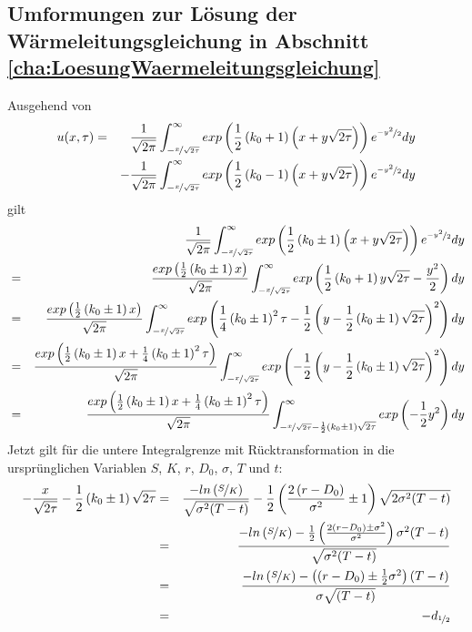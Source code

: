 \subsection{Umformungen zur Lösung der Wärmeleitungsgleichung in Abschnitt \ref{cha:LoesungWaermeleitungsgleichung}} \label{Anhang:UmformungenWLG}
Ausgehend von
\begin{eqnarray*}
u(x,\tau) & = & \frac{1}{\sqrt{2\pi}}\int _{-\nicefrac{x}{\sqrt{2\tau}}}^{\infty} exp\left(\frac{1}{2}\left(k_0+1\right)\left(x+y\sqrt{2\tau}\right)\right)e^{\nicefrac{-y^2}{2}}dy \\
 &   & - \frac{1}{\sqrt{2\pi}}\int _{-\nicefrac{x}{\sqrt{2\tau}}}^{\infty} exp\left(\frac{1}{2}\left(k_0-1\right)\left(x+y\sqrt{2\tau}\right)\right)e^{\nicefrac{-y^2}{2}}dy 
\end{eqnarray*}
gilt
\begin{eqnarray*}
& & \frac{1}{\sqrt{2\pi}}\int _{-\nicefrac{x}{\sqrt{2\tau}}}^{\infty} exp\left(\frac{1}{2}\left(k_0\pm 1\right)\left(x+y\sqrt{2\tau}\right)\right)e^{\nicefrac{-y^2}{2}}dy \\
& = & \frac{exp\left(\frac{1}{2}\left(k_0\pm 1\right)x\right)}{\sqrt{2\pi}} \int _{-\nicefrac{x}{\sqrt{2\tau}}}^{\infty} exp\left(\frac{1}{2}\left(k_0+1\right)y\sqrt{2\tau}-\frac{y^2}{2}\right)dy \\
& = & \frac{exp\left(\frac{1}{2}\left(k_0\pm 1\right)x\right)}{\sqrt{2\pi}} \int _{-\nicefrac{x}{\sqrt{2\tau}}}^{\infty} exp\left(\frac{1}{4}\left(k_0 \pm 1\right)^2\tau -\frac{1}{2}\left(y-\frac{1}{2}\left(k_0\pm 1\right)\sqrt{2\tau}\right)^2\right)dy \\
& = & \frac{exp\left(\frac{1}{2}\left(k_0\pm 1\right)x + \frac{1}{4}\left(k_0 \pm 1\right)^2\tau\right)}{\sqrt{2\pi}} \int _{-\nicefrac{x}{\sqrt{2\tau}}}^{\infty} exp\left(-\frac{1}{2}\left(y-\frac{1}{2}\left(k_0\pm 1\right)\sqrt{2\tau}\right)^2\right)dy \\
& = & \frac{exp\left(\frac{1}{2}\left(k_0\pm 1\right)x + \frac{1}{4}\left(k_0 \pm 1\right)^2\tau\right)}{\sqrt{2\pi}} \int _{-\nicefrac{x}{\sqrt{2\tau}}-\frac{1}{2}\left(k_0\pm 1\right)\sqrt{2\tau}}^{\infty} exp\left(-\frac{1}{2}y^2\right)dy 
\end{eqnarray*}
Jetzt gilt für die untere Integralgrenze mit Rücktransformation in die ursprünglichen Variablen $S$, $K$, $r$, $D_0$, $\sigma$, $T$ und $t$:
\begin{eqnarray*}
-\frac{x}{\sqrt{2\tau}}-\frac{1}{2}\left(k_0\pm 1\right)\sqrt{2\tau} & = & \frac{-ln\left(\nicefrac{S}{K}\right)}{\sqrt{\sigma^2(T-t)}} - \frac{1}{2}\left(\frac{2\left(r-D_0\right)}{\sigma^2} \pm 1\right)\sqrt{2\sigma^2(T-t)} \\
& = & \frac{-ln\left(\nicefrac{S}{K}\right) -\frac{1}{2}\left(\frac{2\left(r-D_0\right)\pm\sigma^2}{\sigma^2}\right)\sigma^2(T-t)}{\sqrt{\sigma^2(T-t)}} \\
& = & \frac{-ln\left(\nicefrac{S}{K}\right) -\left(\left(r-D_0\right)\pm\frac{1}{2}\sigma^2\right)\left(T-t\right)}{\sigma\sqrt{(T-t)}} \\
& = & - d_{\nicefrac{1}{2}}
\end{eqnarray*}
